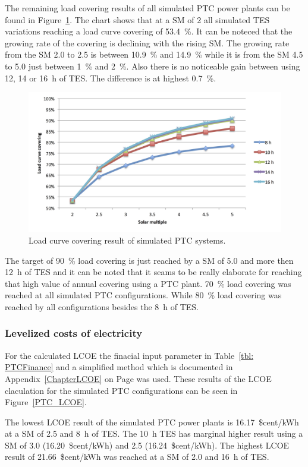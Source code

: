 The remaining load covering results of all simulated PTC power plants can be found in Figure~\ref{PTC_LCCF}. The chart shows that at a SM of 2 all simulated TES variations reaching a load curve covering of 53.4~\%. It can be noteced that the growing rate of the covering is declining with the rising SM. The growing rate from the SM 2.0 to 2.5 is between 10.9~\% and 14.9~\% while it is from the SM 4.5 to 5.0 just between 1~\% and 2~\%. Also there is no noticeable gain between using 12, 14 or 16~h of TES. The difference is at highest 0.7~\%. 

\begin{figure}[htbp]  
\centering
\includegraphics[width=1\linewidth]{FIG/PTC_LCCF}
\caption[Load curve covering result of simulated PTC systems.]{Load curve covering result of simulated PTC systems.}\label{PTC_LCCF}
\end{figure}
The target of 90~\% load covering is just reached by a SM of 5.0 and more then 12~h of TES and it can be noted that it seams to be really elaborate for reaching that high value of annual covering using a PTC plant. 70~\% load covering was reached at all simulated PTC configurations. While 80~\% load covering was reached by all configurations besides the 8~h of TES.
\subsubsection{Levelized costs of electricity}
For the calculated LCOE the finacial input parameter in Table~\ref{tbl: PTCFinance} and a simplified method which is documented in Appendix~\ref{ChapterLCOE} on Page \pageref{ChapterLCOE} was used. These results of the LCOE claculation for the simulated PTC configurations can be seen in Figure~\ref{PTC_LCOE}. 

The lowest LCOE result of the simulated PTC power plants is 16.17~\$cent/kWh at a SM of 2.5 and 8~h of TES. The 10~h TES has marginal higher result using a SM of 3.0 (16.20~\$cent/kWh) and 2.5 (16.24~\$cent/kWh). The highest LCOE result of 21.66~\$cent/kWh was reached at a SM of 2.0 and 16~h of TES. 

